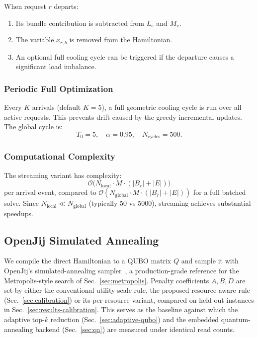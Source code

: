 \documentclass[10pt,a4paper]{article}
\begin{document}
When request $r$ departs:
\begin{enumerate}
  \item Its bundle contribution is subtracted from $L_e$ and $M_v$.
  \item The variable $x_{r,b}$ is removed from the Hamiltonian.
  \item An optional full cooling cycle can be triggered if the
    departure causes a significant load imbalance.
\end{enumerate}

\subsubsection{Periodic Full Optimization}

Every $K$ arrivals (default $K = 5$), a full geometric cooling cycle
is run over all active requests.  This prevents drift caused by the
greedy incremental updates.  The global cycle is:
\begin{equation}
  T_0 = 5,\quad \alpha = 0.95,\quad N_{\text{cycles}} = 500.
\end{equation}

\subsubsection{Computational Complexity}

The streaming variant has complexity:
\begin{equation}
  \mathcal{O}\bigl(N_{\text{local}} \cdot M \cdot (|B_r| + |E|)\bigr)
\end{equation}
per arrival event, compared to $\mathcal{O}(N_{\text{global}} \cdot M
\cdot (|B_r| + |E|))$ for a full batched solve.  Since
$N_{\text{local}} \ll N_{\text{global}}$ (typically 50 vs 5000),
streaming achieves substantial speedups.

\subsection{OpenJij Simulated Annealing}
\label{sec:openjij}

We compile the direct Hamiltonian to a QUBO matrix $Q$ and sample it
with OpenJij's simulated-annealing sampler~\cite{openjij}, a
production-grade reference for the Metropolis-style search of
Sec.~\ref{sec:metropolis}.  Penalty coefficients $A,B,D$ are set by
either the conventional utility-scale rule, the proposed
resource-aware rule (Sec.~\ref{sec:calibration}) or its per-resource
variant, compared on held-out instances in
Sec.~\ref{sec:results-calibration}.  This serves as the
baseline against which the adaptive top-$k$ reduction
(Sec.~\ref{sec:adaptive-qubo}) and the embedded quantum-annealing
backend (Sec.~\ref{sec:qa}) are measured under identical read counts.
\end{document}
